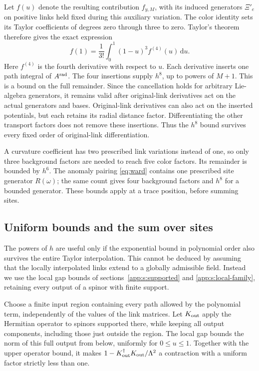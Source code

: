 \documentclass[11pt,a4paper]{article}
\theoremstyle{remark}
\newcommand{\dd}{\mathrm d}
\begin{document}
Let $f(u)$ denote the resulting contribution $f_{y,M}$, with its
induced generators $\Xi'_e$ on positive links held fixed during this
auxiliary variation.
The color identity sets its Taylor coefficients of degrees zero through
three to zero. Taylor's theorem therefore gives the exact expression
\begin{equation}
 f(1)=\frac1{3!}\int_0^1(1-u)^3 f^{(4)}(u)\,\dd u.
 \label{eq:radial-current-remainder}
\end{equation}
Here $f^{(4)}$ is the fourth derivative with respect to $u$.
Each derivative inserts one path integral of $A^{\rm rad}$.
The four insertions supply $h^8$, up to powers of $M+1$.
This is a bound on the full remainder. Since the cancellation holds for arbitrary
Lie-algebra generators, it remains valid after original-link derivatives
act on the actual generators and bases.
Original-link derivatives can also act on the inserted potentials, but
each retains its radial distance factor. Differentiating the other
transport factors does not remove these insertions. Thus the $h^8$
bound survives every fixed order of original-link differentiation.

A curvature coefficient has two prescribed link variations instead of
one, so only three background factors are needed to reach five color
factors. Its remainder is bounded by $h^6$. The anomaly pairing
\eqref{eq:ward} contains one prescribed site generator $R(\omega)$;
the same count gives four background factors and $h^8$ for a bounded
generator. These bounds apply at a trace position, before summing sites.

\subsection{Uniform bounds and the sum over sites}

The powers of $h$ are useful only if the exponential bound in polynomial
order also survives the entire Taylor interpolation. This cannot be
deduced by assuming that the locally interpolated links extend to a
globally admissible field. Instead we use the local gap bounds of
sections~\ref{app:s:supported} and \ref{app:s:local-family}, retaining
every output of a spinor with finite support.

Choose a finite input region containing every path allowed by the
polynomial term, independently of the values of the link matrices.
Let $K_{\rm out}$ apply the Hermitian operator to spinors supported
there, while keeping all output components, including those just outside
the region. The local gap bounds the norm of this full output from
below, uniformly for $0\le u\le1$. Together with the upper operator
bound, it makes $1-K_{\rm out}^\dagger K_{\rm out}/\Lambda^2$
a contraction with a uniform factor strictly less than one.
\end{document}
